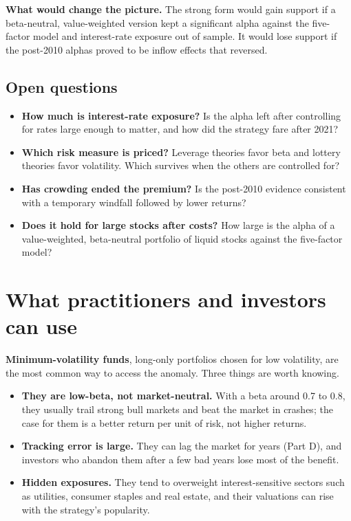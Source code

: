 \textbf{What would change the picture.} The strong form would gain support if a beta-neutral, value-weighted version kept a significant alpha against the five-factor model and interest-rate exposure out of sample. It would lose support if the post-2010 alphas proved to be inflow effects that reversed.

\subsection{Open questions}
\label{sec:18-open}

\begin{itemize}
  \item \textbf{How much is interest-rate exposure?} Is the alpha left after controlling for rates large enough to matter, and how did the strategy fare after 2021?
  \item \textbf{Which risk measure is priced?} Leverage theories favor beta and lottery theories favor volatility. Which survives when the others are controlled for?
  \item \textbf{Has crowding ended the premium?} Is the post-2010 evidence consistent with a temporary windfall followed by lower returns?
  \item \textbf{Does it hold for large stocks after costs?} How large is the alpha of a value-weighted, beta-neutral portfolio of liquid stocks against the five-factor model?
\end{itemize}

\section{What practitioners and investors can use}
\label{sec:18-investors}

\textbf{Minimum-volatility funds}, long-only portfolios chosen for low volatility, are the most common way to access the anomaly. Three things are worth knowing.

\begin{itemize}
  \item \textbf{They are low-beta, not market-neutral.} With a beta around 0.7 to 0.8, they usually trail strong bull markets and beat the market in crashes; the case for them is a better return per unit of risk, not higher returns.
  \item \textbf{Tracking error is large.} They can lag the market for years (Part D), and investors who abandon them after a few bad years lose most of the benefit.
  \item \textbf{Hidden exposures.} They tend to overweight interest-sensitive sectors such as utilities, consumer staples and real estate, and their valuations can rise with the strategy's popularity.
\end{itemize}

